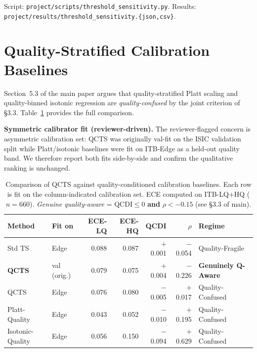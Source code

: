 \documentclass{bmvc2k}
\begin{document}
Script: \texttt{project/scripts/threshold\_sensitivity.py}.
Results: \texttt{project/results/threshold\_sensitivity.\{json,csv\}}.

\section{Quality-Stratified Calibration Baselines}
\label{app:baselines_quality}

Section~5.3 of the main paper argues that quality-stratified Platt scaling and quality-binned isotonic regression are \emph{quality-confused} by the joint criterion of \S3.3. Table~\ref{tab:baseline_quality} provides the full comparison.

\textbf{Symmetric calibrator fit (reviewer-driven).}
The reviewer-flagged concern is asymmetric calibration set: QCTS was originally val-fit on the ISIC validation split while Platt/isotonic baselines were fit on ITB-Edge as a held-out quality band. We therefore report both fits side-by-side and confirm the qualitative ranking is unchanged.

\begin{table}[h]
\centering
\caption{Comparison of QCTS against quality-conditioned calibration baselines. Each row is fit on the column-indicated calibration set. ECE computed on ITB-LQ$+$HQ ($n{=}660$). \emph{Genuine quality-aware} = QCDI${\le}0$ \textbf{and} $\rho{<}{-}0.15$ (see \S3.3 of main).}
\label{tab:baseline_quality}
\footnotesize
\begin{tabular}{llrrrrl}
\toprule
Method & Fit on & ECE-LQ & ECE-HQ & QCDI & $\rho$ & Regime \\
\midrule
Std TS              & Edge & 0.088 & 0.087 & $+$0.001 & $-$0.054 & Quality-Fragile \\
\textbf{QCTS}        & val (orig.) & 0.079 & 0.075 & $+$0.004 & $-$0.226 & \textbf{Genuinely Q-Aware} \\
QCTS                 & Edge & 0.076 & 0.080 & $-$0.005 & $+$0.017 & Quality-Confused \\
Platt-Quality       & Edge & 0.043 & 0.052 & $-$0.010 & $+$0.195 & Quality-Confused \\
Isotonic-Quality    & Edge & 0.056 & 0.150 & $-$0.094 & $+$0.629 & Quality-Confused \\
\bottomrule
\end{tabular}
\end{table}
\end{document}
